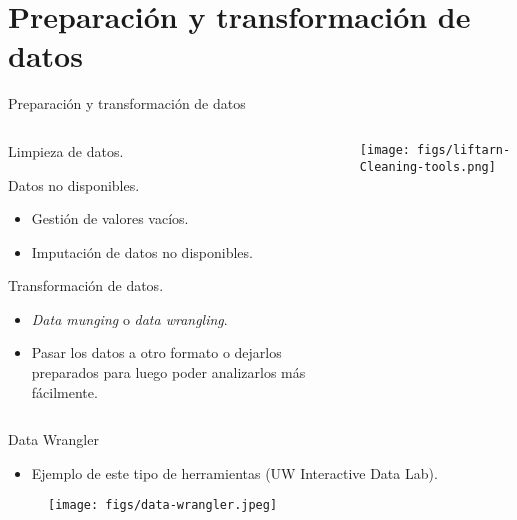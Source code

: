 \section{Preparación y transformación de datos}

\begin{frame}{Preparación y transformación de datos}
 \begin{columns}[T]
    \begin{column}{.75\textwidth}
     \begin{wideitemize}
      \item Limpieza de datos.
      \item Datos no disponibles.
      \begin{itemize}
      \item Gestión de valores vacíos.
      \item Imputación de datos no disponibles.
      \end{itemize}

      \item Transformación de datos.
      \begin{itemize}
      \item \textit{Data munging} o \textit{data wrangling}.
      \item Pasar los datos a otro formato o dejarlos preparados para luego poder 
      analizarlos más fácilmente.
      \end{itemize}

    \end{wideitemize}
    \end{column}
    \begin{column}{.25\textwidth}
    \vspace*{1cm}
    \texttt{[image: figs/liftarn-Cleaning-tools.png]}
    \end{column}
  \end{columns}

\end{frame}


\begin{frame}{Data Wrangler}
\begin{itemize}
 \item Ejemplo de este tipo de herramientas (UW Interactive Data Lab).
\end{itemize}

\begin{figure}
 \centering
 \texttt{[image: figs/data-wrangler.jpeg]}
\end{figure}

\end{frame}


